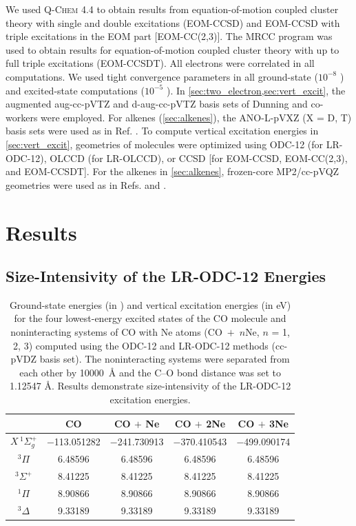 We used \textsc{Q-Chem} 4.4\cite{qchem:44} to obtain results from
equation-of-motion coupled cluster theory with single and double excitations
(EOM-CCSD) and EOM-CCSD with triple excitations in the EOM part [EOM-CC(2,3)].
The \textsc{MRCC} program\cite{MRCC} was used to obtain results for
equation-of-motion coupled cluster theory with up to full triple excitations
(EOM-CCSDT). All electrons were correlated in all computations. We used tight
convergence parameters in all ground-state ($10^{-8}$ \hartree) and excited-state
computations ($10^{-5}$ \hartree). In \cref{sec:two_electron,sec:vert_excit}, the
augmented aug-cc-pVTZ and d-aug-cc-pVTZ basis sets of Dunning and co-workers
were employed.\cite{Kendall:1992p6796} For alkenes (\cref{sec:alkenes}), the
ANO-L-pVXZ (X = D, T) basis sets\cite{Widmark:1990p291} were used as in Ref.
. To compute vertical excitation energies in
\cref{sec:vert_excit}, geometries of molecules were optimized using ODC-12 (for
LR-ODC-12), OLCCD (for LR-OLCCD), or CCSD [for EOM-CCSD, EOM-CC(2,3), and
EOM-CCSDT].
For the alkenes in \cref{sec:alkenes}, frozen-core MP2/cc-pVQZ geometries were
used as in Refs. and .

\section{Results}
\label{sec:results}

\subsection{Size-Intensivity of the LR-ODC-12 Energies}
\label{sec:size_intensivity}

\begin{table}[t]
    \centering
    \caption{Ground-state energies (in \hartree) and vertical excitation energies (in
    eV) for the four lowest-energy excited states of the CO molecule and
noninteracting systems of CO with Ne atoms (\mbox{CO $+$ $n$Ne}, $n$ = 1, 2, 3)
computed using the ODC-12 and LR-ODC-12 methods (cc-pVDZ basis set). The
noninteracting systems were separated from each other by \mbox{10000 \AA} and
the C--O bond distance was set to 1.12547 \AA\@. Results demonstrate size-intensivity of the LR-ODC-12 excitation energies. }
   \label{tab:size_int}
    \begin{tabular}{ccccc}
        \hline
        \hline
        & CO & CO $+$ Ne & CO $+$ 2Ne & CO $+$ 3Ne \\
        \hline
        \({X}\,^1\Sigma_g^+\) & $-$113.051282 & $-$241.730913 & $-$370.410543 & $-$499.090174\\
        \({}^3\Pi\) & 6.48596 & 6.48596 & 6.48596 & 6.48596 \\
        \({}^3\Sigma^+\) & 8.41225 & 8.41225 & 8.41225 & 8.41225 \\
        \({}^1\Pi\) & 8.90866 & 8.90866 & 8.90866 & 8.90866 \\
        \({}^3\Delta\) & 9.33189 & 9.33189 & 9.33189 & 9.33189 \\
        \hline
        \hline
    \end{tabular}
\end{table}

